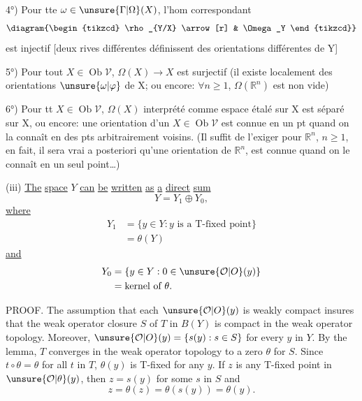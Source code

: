 4°) Pour tte $\omega\in\unsure{\Gamma|\Omega}(X)$, l'hom correspondant
\[
\diagram{\begin{tikzcd}
\rho_{Y/X} \arrow[r] & \Omega_Y
\end{tikzcd}}
\]
est injectif [deux rives différentes définissent des orientations différentes de Y]

5°) Pour tout $X\in\operatorname{Ob}\mathcal V$, $\Omega(X)\to X$ est surjectif (il existe localement des orientations $\unsure{\omega|\varphi}$ de X; ou encore:
$\forall n\geq1$, $\Omega(\mathbb R^n)$ est non vide)

6°) Pour tt $X\in\operatorname{Ob}\mathcal V$, $\Omega(X)$ interprété comme espace étalé sur X est séparé sur X, ou encore:
une orientation d'un $X\in\operatorname{Ob}\mathcal V$ est connue en un pt quand on la connaît en des pts arbitrairement voisins. (Il suffit de l'exiger pour $\mathbb R^n$, $n\geq1$, en fait, il sera vrai a posteriori qu'une orientation de $\mathbb R^n$,  est connue quand on le connaît en un seul point\ldots)

(iii) \uline{The} \uline{space} $Y$ \uline{can} \uline{be} \uline{written} \uline{as} \uline{a} \uline{direct} \uline{sum}
\[
Y=Y_1\oplus Y_0,
\]
\uline{where}
\[
\begin{aligned}
Y_1&=\{y\in Y:y\text{ is a T-fixed point}\}\\
&=\theta(Y)
\end{aligned}
\]
\uline{and}
\[
\begin{aligned}
Y_0&=\{y\in Y:0\in\unsure{\mathcal O|O}(y)\}\\
&=\text{kernel of }\theta.
\end{aligned}
\]

PROOF. The assumption that each $\unsure{\mathcal O|O}(y)$ is weakly compact insures that the weak operator closure $S$ of $T$ in $B(Y)$ is compact in the weak operator topology. Moreover, $\unsure{\mathcal O|O}(y)=\{s(y):s\in S\}$ for every $y$ in $Y$. By the lemma, $T$ converges in the weak operator topology to a zero $\theta$ for $S$. Since $t\circ\theta=\theta$ for all $t$ in $T$, $\theta(y)$ is T-fixed for any $y$. If $z$ is any T-fixed point in $\unsure{\mathcal O|\theta}(y)$, then $z=s(y)$ for some $s$ in $S$ and
\[
z=\theta(z)=\theta(s(y))=\theta(y).
\]
\margin{\unsure{;}}

